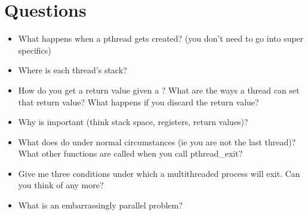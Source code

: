 \section{Questions}\label{questions}

\begin{itemize}
\tightlist
\item
What happens when a pthread gets created? (you don't need to go into super specifics)
\item
Where is each thread's stack?
\item
How do you get a return value given a ? What are the ways a thread can set that return value? What happens if you discard the return value?
\item
Why is  important (think stack space, registers, return values)?
\item
What does  do under normal circumstances (ie you are not the last thread)? What other functions are called when you call pthread\_exit?
\item
Give me three conditions under which a multithreaded process will exit. Can you think of any more?
\item
What is an embarrassingly parallel problem?
\end{itemize}



